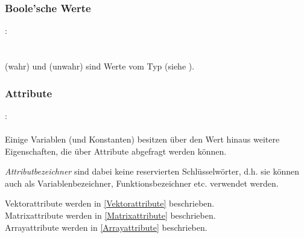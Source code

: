 \subsubsection{Boole'sche Werte}\label{Boole'sche Werte}
:\label{asdr_konst_bool}\\
\hspace*{1cm}\glq{}\grq \\
\hspace*{1cm}\glq{}\grq \\

 (wahr) und  (unwahr) sind Werte vom Typ  (siehe ).


\subsubsection{Attribute}\label{Attribute}
:\label{attribut}\\
\hspace*{1cm} \\


Einige Variablen (und Konstanten) besitzen über den Wert hinaus weitere Eigenschaften, die
über Attribute abgefragt werden können.

\emph{Attributbezeichner} sind dabei keine reservierten
Schlüsselwörter, d.h. sie können auch als Variablenbezeichner, Funktionsbezeichner etc.
verwendet werden.

Vektorattribute werden in \ref{Vektorattribute} beschrieben.\\
Matrixattribute werden in \ref{Matrixattribute} beschrieben.\\
Arrayattribute werden in \ref{Arrayattribute} beschrieben.\\



